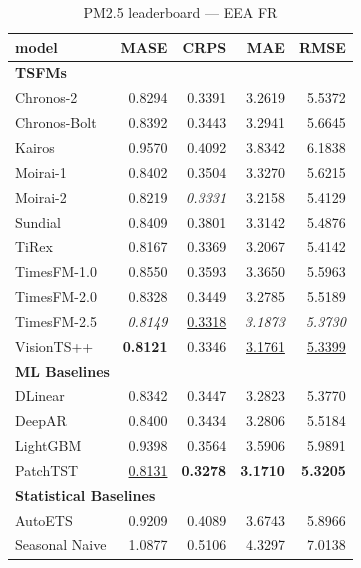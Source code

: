 \begin{table}[H]
\caption{PM2.5 leaderboard --- EEA FR}
\centering
\begin{small}
\begin{tabular}{lrrrr}
\toprule
model & MASE & CRPS & MAE & RMSE \\
\midrule
\multicolumn{5}{l}{\textbf{TSFMs}} \\
Chronos-2 & 0.8294 & 0.3391 & 3.2619 & 5.5372 \\
Chronos-Bolt & 0.8392 & 0.3443 & 3.2941 & 5.6645 \\
Kairos & 0.9570 & 0.4092 & 3.8342 & 6.1838 \\
Moirai-1 & 0.8402 & 0.3504 & 3.3270 & 5.6215 \\
Moirai-2 & 0.8219 & \textit{0.3331} & 3.2158 & 5.4129 \\
Sundial & 0.8409 & 0.3801 & 3.3142 & 5.4876 \\
TiRex & 0.8167 & 0.3369 & 3.2067 & 5.4142 \\
TimesFM-1.0 & 0.8550 & 0.3593 & 3.3650 & 5.5963 \\
TimesFM-2.0 & 0.8328 & 0.3449 & 3.2785 & 5.5189 \\
TimesFM-2.5 & \textit{0.8149} & \underline{0.3318} & \textit{3.1873} & \textit{5.3730} \\
VisionTS++ & \textbf{0.8121} & 0.3346 & \underline{3.1761} & \underline{5.3399} \\
\midrule
\multicolumn{5}{l}{\textbf{ML Baselines}} \\
DLinear & 0.8342 & 0.3447 & 3.2823 & 5.3770 \\
DeepAR & 0.8400 & 0.3434 & 3.2806 & 5.5184 \\
LightGBM & 0.9398 & 0.3564 & 3.5906 & 5.9891 \\
PatchTST & \underline{0.8131} & \textbf{0.3278} & \textbf{3.1710} & \textbf{5.3205} \\
\midrule
\multicolumn{5}{l}{\textbf{Statistical Baselines}} \\
AutoETS & 0.9209 & 0.4089 & 3.6743 & 5.8966 \\
Seasonal Naive & 1.0877 & 0.5106 & 4.3297 & 7.0138 \\
\bottomrule
\end{tabular}
\end{small}
\end{table}